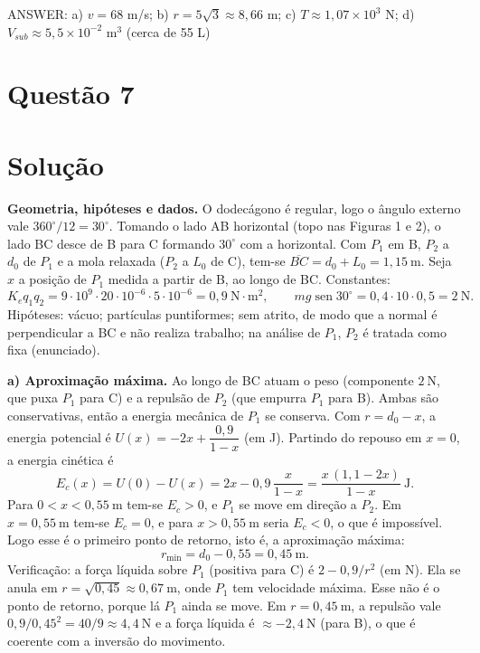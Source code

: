 \documentclass{article}%
\begin{document}
ANSWER: a) $v=68$ m/s; b) $r=5\sqrt{3}\approx 8{,}66$ m; c) $T\approx 1{,}07\times 10^{3}$ N; d) $V_{sub}\approx 5{,}5\times 10^{-2}$ m$^3$ (cerca de 55 L)%
\newpage%
\section*{Questão 7}

\section*{Solução}

\textbf{Geometria, hipóteses e dados.} O dodecágono é regular, logo o ângulo externo vale $360^\circ/12 = 30^\circ$. Tomando o lado AB horizontal (topo nas Figuras 1 e 2), o lado BC desce de B para C formando $30^\circ$ com a horizontal. Com $P_1$ em B, $P_2$ a $d_0$ de $P_1$ e a mola relaxada ($P_2$ a $L_0$ de C), tem-se $\overline{BC} = d_0 + L_0 = 1{,}15\ \mathrm{m}$. Seja $x$ a posição de $P_1$ medida a partir de B, ao longo de BC. Constantes:
\[
K_e q_1 q_2 = 9\cdot 10^{9}\cdot 20\cdot 10^{-6}\cdot 5\cdot 10^{-6} = 0{,}9\ \mathrm{N\cdot m^2},
\qquad
mg\operatorname{sen}30^\circ = 0{,}4\cdot 10\cdot 0{,}5 = 2\ \mathrm{N}.
\]
Hipóteses: vácuo; partículas puntiformes; sem atrito, de modo que a normal é perpendicular a BC e não realiza trabalho; na análise de $P_1$, $P_2$ é tratada como fixa (enunciado).

\textbf{a) Aproximação máxima.} Ao longo de BC atuam o peso (componente $2\ \mathrm{N}$, que puxa $P_1$ para C) e a repulsão de $P_2$ (que empurra $P_1$ para B). Ambas são conservativas, então a energia mecânica de $P_1$ se conserva. Com $r = d_0 - x$, a energia potencial é $U(x) = -2x + \dfrac{0{,}9}{1-x}$ (em J). Partindo do repouso em $x = 0$, a energia cinética é
\[
E_c(x) = U(0) - U(x) = 2x - 0{,}9\,\frac{x}{1-x} = \frac{x\,(1{,}1-2x)}{1-x}\ \mathrm{J}.
\]
Para $0<x<0{,}55\ \mathrm{m}$ tem-se $E_c>0$, e $P_1$ se move em direção a $P_2$. Em $x = 0{,}55\ \mathrm{m}$ tem-se $E_c = 0$, e para $x>0{,}55\ \mathrm{m}$ seria $E_c<0$, o que é impossível. Logo esse é o primeiro ponto de retorno, isto é, a aproximação máxima:
\[
r_{\min} = d_0 - 0{,}55 = 0{,}45\ \mathrm{m}.
\]
Verificação: a força líquida sobre $P_1$ (positiva para C) é $2 - 0{,}9/r^2$ (em N). Ela se anula em $r = \sqrt{0{,}45}\approx 0{,}67\ \mathrm{m}$, onde $P_1$ tem velocidade máxima. Esse não é o ponto de retorno, porque lá $P_1$ ainda se move. Em $r = 0{,}45\ \mathrm{m}$, a repulsão vale $0{,}9/0{,}45^2 = 40/9\approx 4{,}4\ \mathrm{N}$ e a força líquida é $\approx -2{,}4\ \mathrm{N}$ (para B), o que é coerente com a inversão do movimento.
\end{document}
